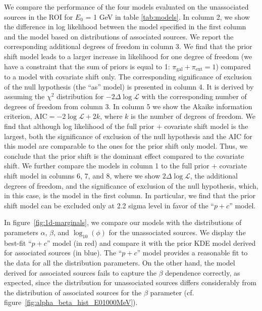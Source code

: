 We compare the performance of the four models evaluated on the unassociated sources in the ROI for $E_0$ = 1 GeV in table \ref{tab:models}.
In column 2, we show the difference in log likelihood between the model specified in the first column and the model based on distributions of associated sources.
We report the corresponding additional degrees of freedom in column 3.
We find that the prior shift model leads to a larger increase in likelihood for one degree of freedom (we have a constraint that the sum of priors is equal to 1: $\pi_\textrm{gal} + \pi_\textrm{ext} =1$) compared to a model with covariate shift only.
The corresponding significance of exclusion of the null hypothesis (the ``as'' model) is presented in column 4.
It is derived by assuming the $\chi^2$ distribution for $-2\Delta \log \mathcal{L}$ with the corresponding number of degrees of freedom from column 3.
In column 5 we show the Akaike information criterion, $\textrm{AIC} = -2\log\mathcal{L} + 2 k$, where $k$ is the number of degrees of freedom.
We find that although log likelihood of the full prior $+$ covariate shift model is the largest,
both the significance of exclusion of the null hypothesis and the AIC for this model are comparable to the ones for the prior shift only model.
Thus, we conclude that the prior shift is the dominant effect compared to the covariate shift.
We further compare the models in column 1 to the full prior $+$ covariate shift model in columns 6, 7, and 8, where we show $2\Delta \log \mathcal{L}$, the additional degrees of freedom, and the significance of exclusion of the null hypothesis, which, in this case, is the model in the first column.
In particular, we find that the prior shift model can be excluded only at 2.2 sigma level in favor of the ``$p + c$'' model.


In figure~\ref{fig:1d-marginals},
we compare our models with the distributions of parameters $\alpha$, $\beta$, and $\log_{10}(\phi)$ for the unassociated sources. 
We display the best-fit ``$p+c$'' model (in red) and compare it with the prior KDE model derived for associated sources (in blue).
The ``$p+c$'' model provides a reasonable fit to the data for all the distribution parameters. On the other hand, the model derived for associated sources fails to capture the $\beta$ dependence correctly, as expected, since the distribution for unassociated sources differs considerably from the distribution of associated sources for the $\beta$ parameter (cf. figure~\ref{fig:alpha_beta_hist_E01000MeV}). 


